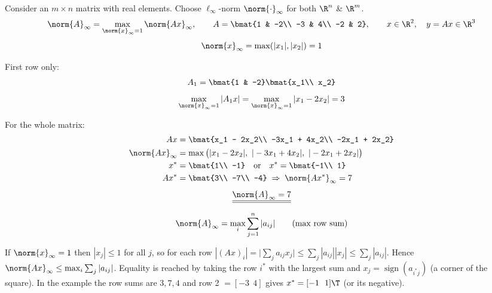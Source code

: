 \begin{example}
Consider an $m\times n$ matrix with real elements. Choose $\ell_\infty$-norm $\norm{\cdot}_\infty$ for both $\R^n$ \& $\R^m$.
\[
\norm{A}_\infty = \max_{\norm{x}_\infty=1} \norm{Ax}_\infty,
\qquad
A = \bmat{1 & -2\\ -3 & 4\\ -2 & 2},
\qquad x\in\R^2,\quad y = Ax \in \R^3
\]
\[
\norm{x}_\infty = \max(|x_1|,|x_2|) = 1
\]
\begin{center}
\begin{minipage}{0.4\textwidth}
\centering
{}
\end{minipage}%
\begin{minipage}{0.55\textwidth}
First row only:
\[
A_1 = \bmat{1 & -2}\bmat{x_1\\ x_2}
\]
\[
\max_{\norm{x}_\infty=1} |A_1 x| = \max_{\norm{x}_\infty=1} |x_1 - 2x_2| = 3
\]
\end{minipage}
\end{center}
For the whole matrix:
\begin{align*}
Ax &= \bmat{x_1 - 2x_2\\ -3x_1 + 4x_2\\ -2x_1 + 2x_2}\\
\norm{Ax}_\infty &= \max\big(|x_1 - 2x_2|,\ |-3x_1+4x_2|,\ |-2x_1+2x_2|\big)\\
x^* &= \bmat{1\\ -1} \quad\text{or}\quad x^* = \bmat{-1\\ 1}\\
Ax^* &= \bmat{3\\ -7\\ -4} \;\Rightarrow\; \norm{Ax^*}_\infty = 7
\end{align*}
\[
\underline{\underline{\norm{A}_\infty = 7}}
\]
\end{example}
\begin{keybox}
\[
\norm{A}_\infty = \max_i \sum_{j=1}^n |a_{ij}| \qquad \text{(max row sum)}
\]
\end{keybox}
\begin{insight}
If $\norm{x}_\infty = 1$ then $|x_j|\le 1$ for all $j$, so for each row
$|(Ax)_i| = \big|\sum_j a_{ij}x_j\big| \le \sum_j |a_{ij}||x_j| \le \sum_j |a_{ij}|$.
Hence $\norm{Ax}_\infty\le\max_i\sum_j|a_{ij}|$. Equality is reached by taking the row $i^*$ with the largest sum and $x_j = \operatorname{sign}(a_{i^*j})$ (a corner of the square). In the example the row sums are $3,7,4$ and row 2 $= [-3\ \ 4]$ gives $x^* = [-1\ \ 1]\T$ (or its negative).
\end{insight}

